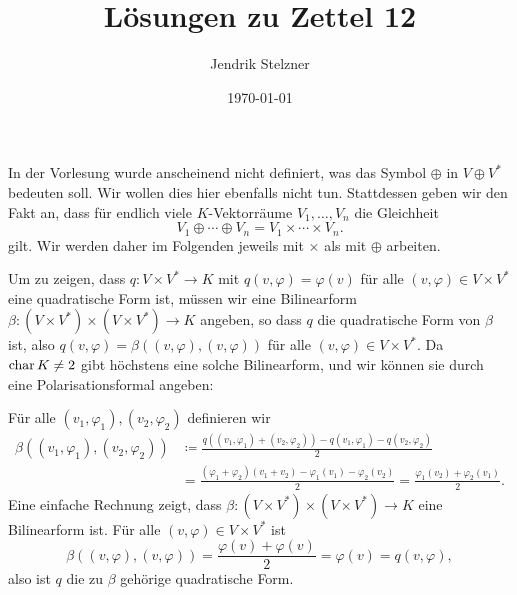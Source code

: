 \documentclass[a4paper,10pt,numbers=noenddot]{scrartcl}
\title{Lösungen zu Zettel 12}
\author{Jendrik Stelzner}
\date{\today}
\begin{document}
\maketitle










\addtocounter{section}{2}










\section{}


\begin{remark}
  In der Vorlesung wurde anscheinend nicht definiert, was das Symbol $\oplus$ in $V \oplus V^*$ bedeuten soll.
  Wir wollen dies hier ebenfalls nicht tun.
  Stattdessen geben wir den Fakt an, dass für endlich viele $K$-Vektorräume $V_1, \dotsc, V_n$ die Gleichheit
  \[
      V_1 \oplus \dotsb \oplus V_n
    = V_1 \times \dotsb \times V_n.
  \]
  gilt.
  Wir werden daher im Folgenden jeweils mit $\times$ als mit $\oplus$ arbeiten.
\end{remark}


Um zu zeigen, dass $q \colon V \times V^* \to K$ mit $q(v, \varphi) = \varphi(v)$ für alle $(v, \varphi) \in V \times V^*$ eine quadratische Form ist, müssen wir eine Bilinearform $\beta \colon (V \times V^*) \times (V \times V^*) \to K$ angeben, so dass $q$ die quadratische Form von $\beta$ ist, also $q(v,\varphi) = \beta((v, \varphi), (v, \varphi))$ für alle $(v,\varphi) \in V \times V^*$.
Da $\operatorname{char} K \neq 2$ gibt höchstens eine solche Bilinearform, und wir können sie durch eine Polarisationsformal angeben:

Für alle $(v_1, \varphi_1), (v_2, \varphi_2)$ definieren wir
\begin{align*}
              \beta((v_1, \varphi_1), (v_2, \varphi_2))
  &\coloneqq  \frac{q((v_1, \varphi_1) + (v_2, \varphi_2)) - q(v_1, \varphi_1) - q(v_2, \varphi_2)}{2}  \\
  &=          \frac{(\varphi_1 + \varphi_2)(v_1 + v_2) - \varphi_1(v_1) - \varphi_2(v_2)}{2}
   =          \frac{\varphi_1(v_2) + \varphi_2(v_1)}{2}.
\end{align*}
Eine einfache Rechnung zeigt, dass $\beta \colon (V \times V^*) \times (V \times V^*) \to K$ eine Bilinearform ist.
Für alle $(v, \varphi) \in V \times V^*$ ist
\[
    \beta((v, \varphi), (v, \varphi))
  = \frac{\varphi(v) + \varphi(v)}{2}
  = \varphi(v)
  = q(v, \varphi),
\]
also ist $q$ die zu $\beta$ gehörige quadratische Form.
\end{document}
